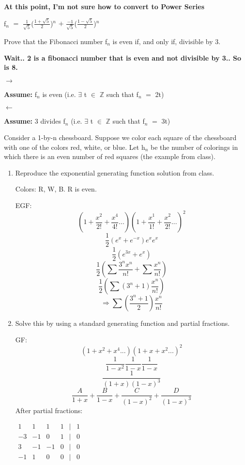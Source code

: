 \documentclass{article}
\newcommand{\mt}[1]{\ensuremath{#1}}
\newcommand{\balist}{\begin{enumerate}[label=\alph*.]}
\newcommand{\elist}{\end{enumerate}}
\newcommand{\as}[1]{\textbf{Assume: } #1}
\newcommand{\bz}{\mt{\mathbb{Z}} }       %
\newcommand{\mem}{\mt{\in} }
\newcommand{\exs}{\mt{\exists} }
\newcommand{\lra}{ \mt{\longrightarrow} } %
\newcommand{\rar}{ \mt{\Rightarrow} }     %
\newcommand{\lla}{ \mt{\longleftarrow} }  %
\newcommand{\ps}{\mt{+} }
\newcommand{\eql}{\mt{=} }
\newcommand{\uw}[2]{#1\mt{_{#2}}}
\newcommand{\uf}[2]{#1\mt{^{#2}}}
\newcommand{\frc}[2]{\mt{\frac{#1}{#2}}}
\newcommand{\eqn}[1]{\[#1\]}
\begin{document}
\begin{enumerate}
   \textbf{At this point, I'm not sure how to convert to Power Series}
   
   \uw{f}{n} \eql \frc{1}{\sqrt{5}}\uf{(\frc{1 + \sqrt{5}}{2})}{n} \ps \frc{-1}{\sqrt{5}}\uf{(\frc{1 - \sqrt{5}}{2})}{n}
   
   
   \elist
   \item Prove that the Fibonacci number \uw{f}{n} is even if, and only if, divisible by 3.
   
   \textbf{Wait.. 2 is a fibonacci number that is even and not divisible by 3.. So is 8.}
   
   \lra
   
   \as{\uw{f}{n} is even (i.e. \exs t \mem \bz such that \uw{f}{n} \eql 2t)}
   
   \lla
   
   \as{3 divides \uw{f}{n} (i.e. \exs t \mem \bz such that \uw{f}{n} \eql 3t)}
   
   \item Consider a 1-by-n chessboard. Suppose we color each square of the chessboard with one of the colors red, white, or blue. Let \uw{h}{n} be the number of colorings in which there is an even number of red squares (the example from class).
   \balist
   \item Reproduce the exponential generating function solution from class.
   
   Colors: R, W, B. R is even.
   
   EGF:
   \eqn{(1 \ps \frac{x^2}{2!} + \frac{x^4}{4!}...)(1 \ps \frac{x^1}{1!} + \frac{x^2}{2!}...)^2}
   \eqn{\frac{1}{2}(e^x + e^{-x})e^xe^x}
   \eqn{\frac{1}{2}(e^{3x} + e^x)}
   \eqn{\frac{1}{2}(\sum\frac{3^nx^n}{n!} + \sum\frac{x^n}{n!})}
   \eqn{\frac{1}{2}(\sum(3^n + 1)\frac{x^n}{n!})}
   \eqn{\rar \sum(\frac{3^n + 1}{2})\frac{x^n}{n!}}
   \item Solve this by using a standard generating function and partial fractions.
   
   GF:
   \eqn{(1 + x^2 + x^4 ...)(1 + x + x^2 ...)^2}
   \eqn{\frac{1}{1 - x^2}\frac{1}{1 - x}\frac{1}{1 - x}}
   \eqn{\frac{1}{(1 + x)(1 - x)^3}}
   \eqn{\frac{A}{1 + x} + \frac{B}{1 - x} + \frac{C}{(1 - x)^2} + \frac{D}{(1 - x)^3}}
   After partial fractions:
   
   \mt{
   	\begin{matrix}
  	1 & 1 & 1 & 1 & | & 1\\
  	-3 & -1 & 0 & 1 & | & 0 \\
  	3 & -1 & -1 & 0 & | & 0 \\
  	-1 & 1 & 0 & 0 & | & 0
	\end{matrix}
	}
	

\end{enumerate}
\end{document}
